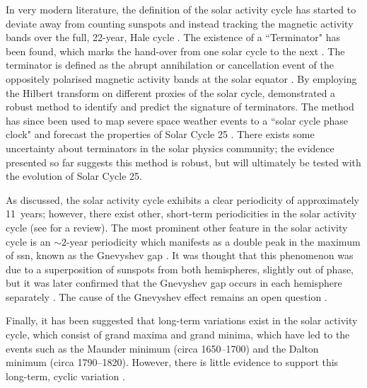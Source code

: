 In very modern literature, the definition of the solar activity cycle has started to deviate away from counting sunspots and instead tracking the magnetic activity bands over the full, 22-year, Hale cycle \citep{leamon_timing_2020}. The existence of a ``Terminator" has been found, which marks the hand-over from one solar cycle to the next \citep{mcintosh_deciphering_2014, mcintosh_what_2019}. The terminator is defined as the abrupt annihilation or cancellation event of the oppositely polarised magnetic activity bands at the solar equator \citep{mcintosh_what_2019}. By employing the Hilbert transform on different proxies of the solar cycle, \citet{leamon_timing_2020} demonstrated a robust method to identify and predict the signature of terminators. The method has since been used to map severe space weather events to a ``solar cycle phase clock" \citep{chapman_quantifying_2020} and forecast the properties of Solar Cycle 25 \citep{mcintosh_overlapping_2020}. There exists some uncertainty about terminators in the solar physics community; the evidence presented so far suggests this method is robust, but will ultimately be tested with the evolution of Solar Cycle 25.


As discussed, the solar activity cycle exhibits a clear periodicity of approximately 11~years; however, there exist other, short-term periodicities in the solar activity cycle (see \citet{hathaway_solar_2015} for a review). The most prominent other feature in the solar activity cycle is an $\sim2$-year periodicity which manifests as a double peak in the maximum of \gls{ssn}, known as the Gnevyshev gap \citep{gnevyshev_corona_1963, gnevyshev_11-years_1967}. It was thought that this phenomenon was due to a superposition of sunspots from both hemispheres, slightly out of phase, but it was later confirmed that the Gnevyshev gap occurs in each hemisphere separately \citep{norton_solar-cycle_2009}. The cause of the Gnevyshev effect remains an open question \citep{hathaway_solar_2015}.

Finally, it has been suggested that long-term variations exist in the solar activity cycle, which consist of grand maxima and grand minima, which have led to the events such as the Maunder minimum (circa 1650--1700) and the Dalton minimum (circa 1790--1820). However, there is little evidence to support this long-term, cyclic variation \citep{hathaway_solar_2015}.



